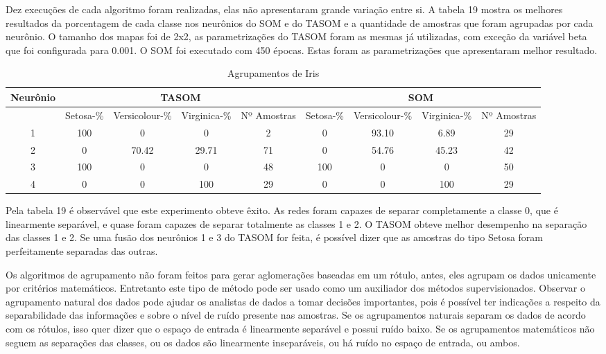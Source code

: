 Dez execuções de cada algoritmo foram realizadas, elas não apresentaram grande variação entre si. A tabela 19 mostra os melhores resultados da porcentagem de cada classe nos neurônios do SOM e do TASOM e a quantidade de amostras que foram agrupadas por cada neurônio. O tamanho dos mapas foi de 2x2, as parametrizações do TASOM foram as mesmas já utilizadas, com exceção da variável beta que foi configurada para 0.001. O SOM foi executado com 450 épocas. Estas foram as parametrizações que apresentaram melhor resultado.

\begin{table}[h]
\centering
\caption{Agrupamentos de Iris}
\label{my-label}
\begin{tabular}{|c|c|c|c|c|c|c|c|c|}
\hline
Neurônio & \multicolumn{4}{c|}{TASOM}                   & \multicolumn{4}{c|}{SOM}                     \\ \hline
         & Setosa-\% & Versicolour-\% & Virginica-\% & Nº Amostras & Setosa-\% & Versicolour-\% & Virginica-\% & Nº Amostras \\ \hline
1        & 100      & 0        & 0        & 2           & 0       & 93.10        & 6.89       & 29         \\ \hline
2        & 0        & 70.42    & 29.71    & 71          & 0        & 54.76        & 45.23        & 42           \\ \hline
3        & 100      & 0        & 0        & 48          & 100        & 0        & 0        & 50           \\ \hline
4        & 0        & 0        & 100      & 29          & 0      & 0        & 100        & 29          \\ \hline
\end{tabular}
\end{table} 
 
Pela tabela 19 é observável que este experimento obteve êxito. As redes foram capazes de separar completamente a classe 0, que é linearmente separável, e quase foram capazes de separar totalmente as classes 1 e 2. O TASOM obteve melhor desempenho na separação das classes 1 e 2. Se uma fusão dos neurônios 1 e 3 do TASOM for feita, é possível dizer que as amostras do tipo Setosa foram perfeitamente separadas das outras. 
 
Os algoritmos de agrupamento não foram feitos para gerar aglomerações baseadas em um rótulo, antes, eles agrupam os dados unicamente por critérios matemáticos. Entretanto este tipo de método pode ser usado como um auxiliador dos métodos supervisionados. Observar o agrupamento natural dos dados pode ajudar os analistas de dados a tomar decisões importantes, pois é possível ter indicações a respeito da separabilidade das informações e sobre o nível de ruído presente nas amostras. Se os agrupamentos naturais separam os dados de acordo com os rótulos, isso quer dizer que o espaço de entrada é linearmente separável e possui ruído baixo. Se os agrupamentos matemáticos não seguem as separações das classes, ou os dados são linearmente inseparáveis, ou há ruído no espaço de entrada, ou ambos. 

